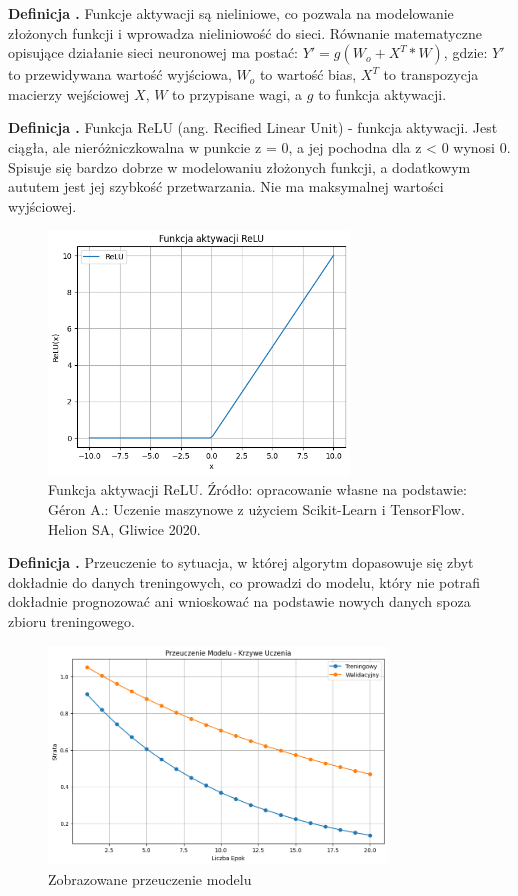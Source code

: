 \noindent
\textbf{Definicja \mlDefinitionIndex.}
\incrementMlDefinitionIndex
Funkcje aktywacji są nieliniowe, co pozwala na modelowanie złożonych funkcji i wprowadza nieliniowość do sieci.
Równanie matematyczne opisujące działanie sieci neuronowej ma postać: $Y' = g(W_o + X^T * W)$, gdzie:
$Y'$ to przewidywana wartość wyjściowa,
$W_o$ to wartość bias,
$X^T$ to transpozycja macierzy wejściowej $X$,
$W$ to przypisane wagi,
a $g$ to funkcja aktywacji.

\noindent
\textbf{Definicja \mlDefinitionIndex.}
\incrementMlDefinitionIndex
Funkcja ReLU (ang. Recified Linear Unit) - funkcja aktywacji.
Jest ciągła, ale nieróżniczkowalna w punkcie z = 0, a jej pochodna dla z < 0 wynosi 0.
Spisuje się bardzo dobrze w modelowaniu złożonych funkcji, a dodatkowym aututem jest jej szybkość przetwarzania.
Nie ma maksymalnej wartości wyjściowej.

\begin{figure}[ht]
	\centering
	\includegraphics[width=8cm]{resources/machine-learning/images/def_relu.png}
	\caption{Funkcja aktywacji ReLU.
		Źródło: opracowanie własne na podstawie:
        Géron A.: Uczenie maszynowe z użyciem Scikit-Learn i TensorFlow. Helion SA, Gliwice 2020.}
    \label{Fig:def-1}
\end{figure}

\noindent
\textbf{Definicja \mlDefinitionIndex.}
\incrementMlDefinitionIndex
Przeuczenie to sytuacja, w której algorytm dopasowuje się zbyt dokładnie do danych treningowych,
co prowadzi do modelu, który nie potrafi dokładnie prognozować ani wnioskować na podstawie nowych danych spoza zbioru treningowego.

\begin{figure}[ht]
	\centering
	\includegraphics[width=9cm]{resources/machine-learning/images/def_overfit.png}
	\caption{Zobrazowane przeuczenie modelu}
    \label{Fig:def-2}
\end{figure}

